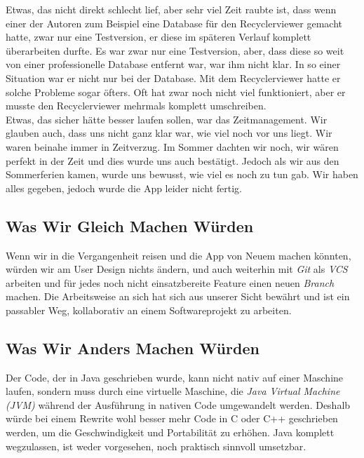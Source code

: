 \documentclass[a4paper,11pt]{article}
\begin{document}
Etwas, das nicht direkt schlecht lief, aber sehr viel Zeit raubte ist, dass wenn einer der Autoren zum Beispiel eine Database für den Recyclerviewer gemacht hatte, zwar nur eine Testversion, 
er diese im späteren Verlauf komplett überarbeiten durfte. Es war zwar nur eine Testversion, aber, dass diese so weit von einer professionelle Database entfernt war, war ihm nicht klar. 
In so einer Situation war er nicht nur bei der Database. Mit dem Recyclerviewer hatte er solche Probleme sogar öfters. Oft hat zwar noch nicht viel funktioniert, aber er musste den Recyclerviewer
mehrmals komplett umschreiben. \\


Etwas, das sicher hätte besser laufen sollen, war das Zeitmanagement. Wir glauben auch, dass uns nicht ganz klar war, wie viel 
noch vor uns liegt. Wir waren beinahe immer in Zeitverzug. Im Sommer dachten wir noch, wir wären perfekt in der Zeit und dies wurde uns auch bestätigt. Jedoch
als wir aus den Sommerferien kamen, wurde uns bewusst, wie viel es noch zu tun gab. Wir haben alles gegeben, jedoch wurde die App leider nicht fertig. 

\subsection{Was Wir Gleich Machen Würden}
Wenn wir in die Vergangenheit reisen und die App von Neuem machen könnten, würden wir am User Design nichts ändern, und auch weiterhin mit \textit{Git} als \textit{VCS} arbeiten und für jedes noch nicht einsatzbereite Feature einen neuen \textit{Branch} machen. Die Arbeitsweise an sich hat sich aus unserer Sicht bewährt und ist ein passabler Weg, kollaborativ an einem Softwareprojekt zu arbeiten.


\subsection{Was Wir Anders Machen Würden}

Der Code, der in Java geschrieben wurde, kann nicht nativ auf einer Maschine laufen, sondern muss durch eine virtuelle Maschine, die \textit{Java Virtual Machine (JVM)} während der Ausführung in nativen Code umgewandelt werden. Deshalb würde bei einem Rewrite wohl besser mehr Code in C oder C++ geschrieben werden, um die Geschwindigkeit und Portabilität zu erhöhen. Java komplett wegzulassen, ist weder vorgesehen, noch praktisch sinnvoll umsetzbar. \\
\end{document}
